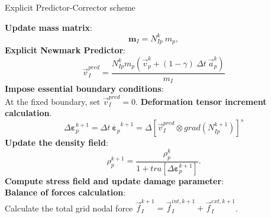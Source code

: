 \documentclass[preprint,12pt,a4paper]{elsarticle}
\newcommand{\tens}[1]{
  \ensuremath{\mathbf{{#1}}}
}
\newcommand\Grad[1]{grad({#1})}
\begin{document}
\begin{algorithm}
  \renewcommand{\thealgorithm}{}
  \caption{Explicit Predictor-Corrector scheme}
  \begin{algorithmic}[1]
    \STATE \textbf{Update mass matrix}:
    \begin{equation*}
      \tens{m}_{I} = N_{Ip}^{k}\ m_p,
    \end{equation*}
    \STATE \textbf{Explicit Newmark Predictor}:\\
    \begin{equation*}
      \vec{v}_I^{pred} = \frac{ N_{Ip}^{k} m_p (\vec{v}_p^k + (1 - \gamma)\ \Delta t\ \vec{a}_p^k)}{m_I}
    \end{equation*}
    \STATE \textbf{Impose essential boundary conditions}:\\
    At the fixed boundary, set $\vec{v}_{I}^{pred} = 0$. 
    \STATE \textbf{Deformation tensor increment calculation}.
    \begin{equation*}
      \Delta \tens{\varepsilon}_{p}^{k+1} = \Delta t\
        \dot{\tens{\varepsilon}_{p}}^{k+1} = \Delta \left[ \vec{v}_{I}^{pred} \otimes
        \Grad{N_{Ip}^{k+1}} \right]^s
    \end{equation*}
    \STATE \textbf{Update the density field}:
    \begin{equation*}
      \rho_p^{k+1} = \frac{\rho_p^k}{1 + \mathit{tra}\left[\Delta\tens{\varepsilon}_{p}^{k+1}\right]}.
    \end{equation*}
    \STATE \textbf{Compute stress field and update damage parameter}:\\
    \STATE \textbf{Balance of forces calculation}:\\
    Calculate the total grid nodal force $\vec{f}_{I}^{k+1} =
    \vec{f}_{I}^{int,k+1} + \vec{f}_{I}^{ext,k+1}$.

\end{algorithmic}
\end{algorithm}
\end{document}

